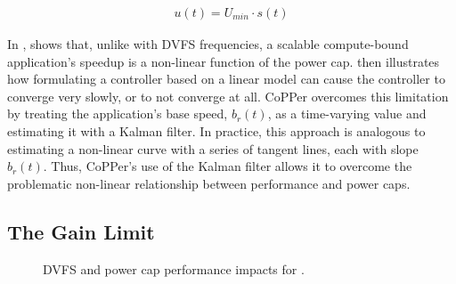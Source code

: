 \begin{eqnarray}
  u(t) = U_{min} \cdot s(t)
  \label{eqn:new-powercap}
\end{eqnarray}

In ,  shows that, unlike with DVFS frequencies, a scalable compute-bound application's speedup is a non-linear function of the power cap.
 then illustrates how formulating a controller based on a linear model can cause the controller to converge very slowly, or to not converge at all.
CoPPer overcomes this limitation by treating the application's base speed, $b_r(t)$, as a time-varying value and estimating it with a Kalman filter.
In practice, this approach is analogous to estimating a non-linear curve with a series of tangent lines, each with slope $b_r(t)$.
Thus, CoPPer's use of the Kalman filter allows it to overcome the problematic non-linear relationship between performance and power caps.


\subsection{The Gain Limit}
\label{sec:copper-framework-gain}

\begin{figure}[t]
  \centering
  \subfloat[DVFS.]%
  {%
  \label{fig:copper-tradeoffs-hop-dvfs}}
  \hspace*{0.5cm}
  \caption{DVFS and power cap performance impacts for .}
  \label{fig:copper-tradeoffs-hop}
\end{figure}

